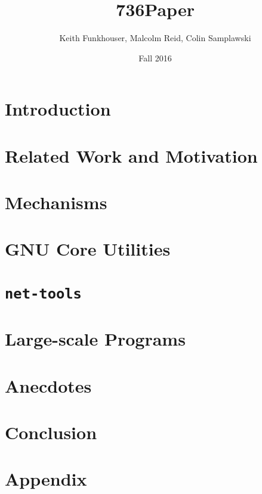 \documentclass[10pt]{article}
\title{736Paper}
\author{Keith Funkhouser, Malcolm Reid, Colin Samplawski}
\date{Fall 2016}
\begin{document}
\setlength{\baselineskip}{18pt}
\maketitle

\section{Introduction}


\section{Related Work and Motivation}



\section{Mechanisms}




\section{GNU Core Utilities}


\section{\texttt{net-tools}}


\section{Large-scale Programs}


\section{Anecdotes}


\section{Conclusion}




\newpage
\appendix
\section*{Appendix}


\end{document}
